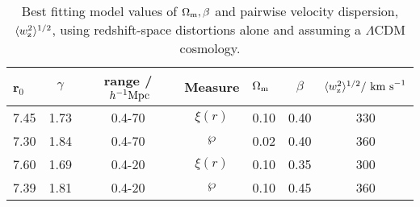 \documentclass[usenatbib]{mn2e}
\def \hmpc{\;h^{-1}{\rm Mpc}}
\def \kms {{\rm ~km~s}^{-1}}
\def \Omm {\Omega_{\rm m}}
\def \wrms {\langle w_{\rm z}^2\rangle^{1/2}}
\def \xir{\xi(r)}
\begin{document}
\begin{table*}
\centering
\caption{Best fitting model values of $\Omm, \beta$ and 
pairwise velocity dispersion, $\wrms$, 
using redshift-space distortions alone and assuming a $\Lambda$CDM cosmology.}
\begin{tabular}{||l|c|c|c|l|c|c} \hline
\hline
r$_{0}$ & $\gamma$ &  range /$\hmpc$ & Measure & $\Omm$ & $\beta$ & $\wrms / \kms$ \\
\hline
7.45     &  1.73    &  0.4-70        & $\xir$  &   0.10 &  0.40   &  330    \\
7.30     &  1.84    &  0.4-70	     & $\wp $  &   0.02 &  0.40   &  360    \\
7.60     &  1.69    &  0.4-20        & $\xir$  &   0.10 &  0.35   &  300    \\
7.39     &  1.81    &  0.4-20        & $\wp$   &   0.10 &  0.45   &  360    \\
\hline
\end{tabular}
\label{tab:zspace_dist_values}
\end{table*}






\end{document}
